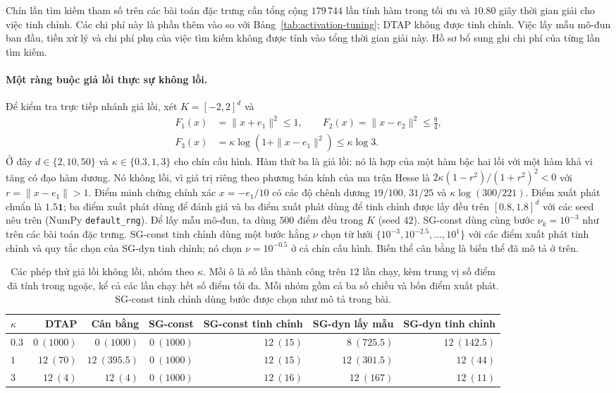 Chín lần tìm kiếm tham số trên các bài toán đặc trưng cần tổng cộng $179\,744$ lần tính hàm trong tối ưu
và $10.80$ giây thời gian giải cho việc tinh chỉnh. Các chi phí này
là phần thêm vào so với Bảng~\ref{tab:activation-tuning}; DTAP không được tinh chỉnh.
Việc lấy mẫu mô-đun ban đầu, tiền xử lý và chi phí phụ của việc tìm kiếm không được tính
vào tổng thời gian giải này. Hồ sơ bổ sung ghi chi phí của
từng lần tìm kiếm.

\paragraph*{Một ràng buộc giả lồi thực sự không lồi.}
Để kiểm tra trực tiếp nhánh giả lồi, xét $K=[-2,2]^d$ và
\begin{equation}\label{eq:logball-test}
\begin{aligned}
 F_1(x)&=\|x+e_1\|^2\le1,\qquad
 F_2(x)=\|x-e_2\|^2\le\tfrac94,\\
 F_3(x)&=\kappa\log(1+\|x-e_1\|^2)\le \kappa\log3.
\end{aligned}
\end{equation}
Ở đây $d\in\{2,10,50\}$ và $\kappa\in\{0.3,1,3\}$ cho chín cấu hình.
Hàm thứ ba là giả lồi: nó là hợp của một hàm bậc hai lồi với một hàm khả vi tăng
có đạo hàm dương. Nó không
lồi, vì giá trị riêng theo phương bán kính của ma trận Hesse là
$2\kappa(1-r^2)/(1+r^2)^2<0$ với $r=\|x-e_1\|>1$.
Điểm minh chứng chính xác $x=-e_1/10$ có các độ chênh dương
$19/100$, $31/25$ và $\kappa\log(300/221)$.
Điểm xuất phát chuẩn là $1.5\mathbf1$; ba điểm xuất phát dùng để đánh giá và ba
điểm xuất phát dùng để tinh chỉnh được lấy đều trên $[0.8,1.8]^d$ với các seed nêu trên
(NumPy \texttt{default\_rng}).
Để lấy mẫu mô-đun, ta dùng $500$ điểm đều trong $K$ (seed $42$).
SG-const dùng cùng bước $\nu_k=10^{-3}$ như trên các bài toán đặc trưng. SG-const
tinh chỉnh dùng một bước hằng $\nu$ chọn từ lưới
$\{10^{-3},10^{-2.5},\ldots,10^1\}$ với các điểm xuất phát tinh chỉnh và quy tắc chọn của
SG-dyn tinh chỉnh; nó chọn $\nu=10^{-0.5}$ ở cả chín cấu hình. Biến thể cân bằng
là biến thể đã mô tả ở trên.

\begin{table}[t]
\centering\small
\setlength{\tabcolsep}{5pt}
\caption{Các phép thử giả lồi không lồi, nhóm theo $\kappa$.
Mỗi ô là số lần thành công trên $12$ lần chạy, kèm trung vị số
điểm đã tính trong ngoặc, kể cả các lần chạy hết số điểm tối đa. Mỗi nhóm
gồm cả ba số chiều và bốn điểm xuất phát. SG-const tinh chỉnh dùng bước
được chọn như mô tả trong bài.}
\label{tab:synthetic-scale}
\begin{tabular}{@{}lrrrrrr@{}}
\toprule
$\kappa$ & DTAP & Cân bằng & SG-const & SG-const tinh chỉnh & SG-dyn lấy mẫu & SG-dyn tinh chỉnh\\
\midrule
$0.3$ & $0\ (1000)$ & $0\ (1000)$ & $0\ (1000)$ & $12\ (15)$ & $8\ (725.5)$ & $12\ (142.5)$\\
$1$   & $12\ (70)$ & $12\ (395.5)$ & $0\ (1000)$ & $12\ (15)$ & $12\ (301.5)$ & $12\ (44)$\\
$3$   & $12\ (4)$ & $12\ (4)$ & $0\ (1000)$ & $12\ (16)$ & $12\ (167)$ & $12\ (11)$\\
\bottomrule
\end{tabular}
\end{table}

